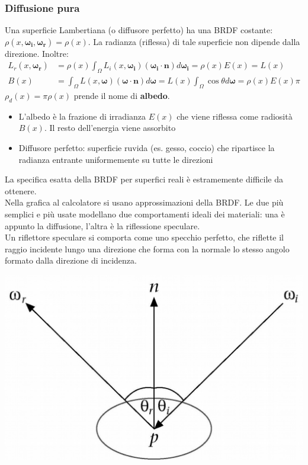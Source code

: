 \documentclass[a4paper, 10pt]{article}
\renewcommand{\vec}{\bm}
\begin{document}
		\subsubsection{Diffusione pura}
			Una superficie Lambertiana (o diffusore perfetto) ha una BRDF
			costante: $ \rho(x, \vec{\omega_i}, \vec{\omega_r}) = \rho(x) $. 
			La radianza (riflessa) di tale superficie non dipende dalla direzione.
			Inoltre:
			\begin{align*}
				L_r (x, \vec{\omega_r}) &= \rho(x) \int_{\Omega} L_i (x, \vec{\omega_i} )(\vec{\omega_i} \cdot \vec{n}) d\vec{\omega_i} =
				\rho(x)E(x) = L(x) \\
				B(x) &= \int_{\Omega} L (x, \vec{\omega} )(\vec{\omega} \cdot \vec{n}) d\vec{\omega} = L(x) \int_{\Omega} \cos\theta d\vec{\omega} = \rho(x) E(x)\pi
			\end{align*}
			$ \rho_d(x)= \pi \rho(x) $ prende il nome di \textbf{albedo}.
			\begin{itemize}
				\item L’albedo è la frazione di irradianza $ E(x) $ che viene riflessa come
				radiosità $ B(x) $. Il resto dell’energia viene assorbito
				\item Diffusore perfetto: superficie ruvida (es. gesso, coccio) che ripartisce
				la radianza entrante uniformemente su tutte le direzioni
			\end{itemize}
			
			\bigskip
			
			La specifica esatta della BRDF per superfici reali è estramemente
			difficile da ottenere.\\
			Nella grafica al calcolatore si usano approssimazioni della
			BRDF. Le due più semplici e più usate modellano due
			comportamenti ideali dei materiali: una è appunto la
			diffusione, l'altra è la riflessione speculare.\\
			Un riflettore speculare si comporta come uno specchio
			perfetto, che riflette il raggio incidente lungo una direzione
			che forma con la normale lo	stesso angolo formato dalla
			direzione di incidenza.
			
			\includegraphics[scale=0.15]{brdf1}
			
\end{document}
